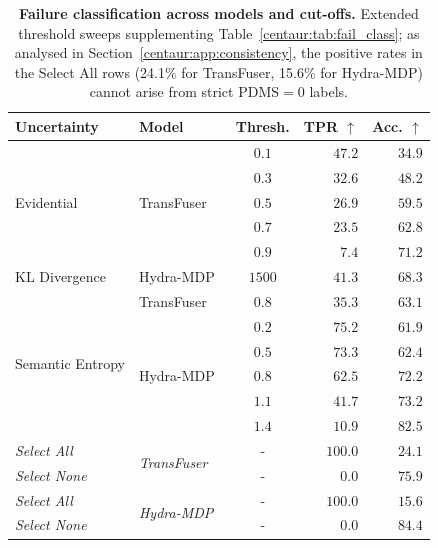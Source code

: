 \begin{table}[t]
  \centering
  \caption[Threshold sweep for failure classification]{\textbf{Failure classification across models and cut-offs.} Extended threshold sweeps supplementing Table~\ref{centaur:tab:fail_class}; as analysed in Section~\ref{centaur:app:consistency}, the positive rates in the Select All rows (24.1\% for TransFuser, 15.6\% for Hydra-MDP) cannot arise from strict $\mathrm{PDMS}=0$ labels.}
  \label{centaur:tab:fail_class_supp}
  \begin{tabular}{l|l|c|rr}
    \toprule
    \textbf{Uncertainty} & \textbf{Model} & \textbf{Thresh.} & \textbf{TPR} $\uparrow$ & \textbf{Acc.} $\uparrow$ \\
    \midrule
    \multirow{5}{*}{Evidential} & \multirow{5}{*}{TransFuser~\cite{chitta2023transfuser}} & $0.1$ & $47.2$ & $34.9$ \\
    & & $0.3$ & $32.6$ & $48.2$ \\
    & & $0.5$ & $26.9$ & $59.5$ \\
    & & $0.7$ & $23.5$ & $62.8$ \\
    & & $0.9$ & $7.4$ & $71.2$ \\
    \midrule
    KL Divergence & Hydra-MDP~\cite{li2024hydramdp} & $1500$ & $41.3$ & $68.3$ \\
    \midrule
    \multirow{6}{*}{Semantic Entropy} & TransFuser~\cite{chitta2023transfuser} & $0.8$ & $35.3$ & $63.1$ \\
    \cmidrule{2-5}
    & \multirow{5}{*}{Hydra-MDP~\cite{li2024hydramdp}} & $0.2$ & $75.2$ & $61.9$ \\
    & & $0.5$ & $73.3$ & $62.4$ \\
    & & $0.8$ & $62.5$ & $72.2$ \\
    & & $1.1$ & $41.7$ & $73.2$ \\
    & & $1.4$ & $10.9$ & $82.5$ \\
    \midrule
    \textit{Select All} & \multirow{2}{*}{\textit{TransFuser}~\cite{chitta2023transfuser}} & - & $\mathit{100.0}$ & $\mathit{24.1}$ \\
    \textit{Select None} & & - & $\mathit{0.0}$ & $\mathit{75.9}$ \\
    \midrule
    \textit{Select All} & \multirow{2}{*}{\textit{Hydra-MDP}~\cite{li2024hydramdp}} & - & $\mathit{100.0}$ & $\mathit{15.6}$ \\
    \textit{Select None} & & - & $\mathit{0.0}$ & $\mathit{84.4}$ \\
    \bottomrule
  \end{tabular}
\end{table}

